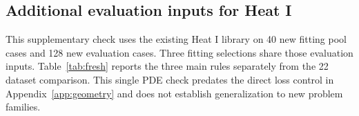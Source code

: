 \subsection{Additional evaluation inputs for Heat I}
\label{app:additionalheat}
This supplementary check uses the existing Heat I library on 40 new fitting
pool cases and 128 new evaluation cases. Three fitting selections share those
evaluation inputs. Table~\ref{tab:fresh} reports the three main rules
separately from the 22 dataset comparison. This single PDE check predates
the direct loss control in Appendix~\ref{app:geometry} and does not establish
generalization to new problem families.

\begin{table}[h!]
\centering\small
\caption{\textbf{Additional Heat I inputs.} Mean relative $L^2$ errors in percent.
Three fitting selections share the same 128 evaluation inputs and trained models.}
\label{tab:fresh}
\end{table}
